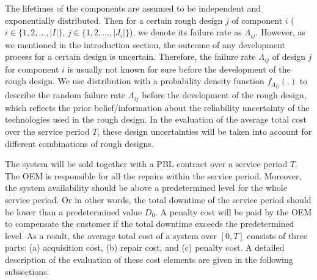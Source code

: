 \documentclass[preprint,12pt]{elsarticle}
\begin{document}
The lifetimes of the components are assumed to be independent and exponentially distributed. Then for a certain rough design $j$ of component $i$ ($i \in \{1,2,...,\lvert I \rvert\}$, $j \in \{1,2,...,\lvert J_{i} \rvert\}$), we denote its failure rate as $\Lambda_{ij}$. However, as we mentioned in the introduction section, the outcome of any development process for a certain design is uncertain. Therefore, the failure rate $\Lambda_{ij}$ of design $j$ for component $i$ is usually not known for sure before the development of the rough design. We use distribution with a probability density function $f_{\Lambda_{ij}}(.)$ to describe the random failure rate $\Lambda_{ij}$ before the development of the rough design, which reflects the prior belief/information about the reliability uncertainty of the technologies used in the rough design. In the evaluation of the average total cost over the service period $T$, these design uncertainties will be taken into account for different combinations of rough designs.

The system will be sold together with a PBL contract over a service period $T$. The OEM is responsible for all the repairs within the service period. Moreover, the system availability should be above a predetermined level for the whole service period. Or in other words, the total downtime of the service period should be lower than a predetermined value $D_0$. A penalty cost will be paid by the OEM to compensate the customer if the total downtime exceeds the predetermined level. As a result, the average total cost of a system over $[0, T]$ consists of three parts: (a) acquisition cost, (b) repair cost, and (c) penalty cost. A detailed description of the evaluation of these cost elements are given in the following subsections.

\end{document}
